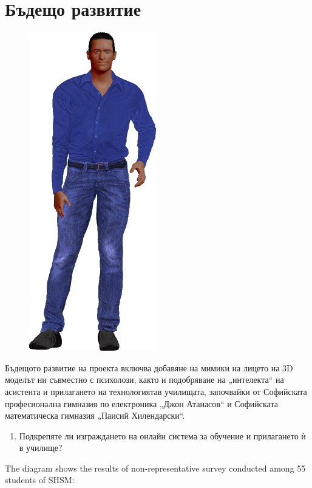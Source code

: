 \documentclass[a4paper, 12pt]{article}
\newenvironment{myblock}[1]
  {\begin{tcolorbox}[colback=green!5,colframe=green!40!black,title=#1]}
  {\end{tcolorbox}}
\begin{document}
	\section{Бъдещо развитие}
	\begin{figure}
		\includegraphics[scale=0.35]{../bad_boy.png}
	\end{figure}
	Бъдещото развитие на проекта включва добавяне на мимики на лицето на 3D моделът ни съвместно с психолози, както и подобряване на „интелекта“ на асистента и прилагането на технологиятав училищата, започвайки от Софийската професионална гимназия по електроника „Джон Атанасов“ и Софийската математическа гимназия „Паисий Хилендарски“. \\ \vspace{0.5cm}
	\begin{center}
		\begin{myblock}{Въпроси от анкета}
			\begin{enumerate}
				\item Подкрепяте ли изграждането на онлайн система за обучение и прилагането ѝ в училище?
			\end{enumerate}
		\end{myblock}
	\end{center}
	The diagram shows the results of non-representative survey conducted among 55 students of SHSM: \\
	\begin{center}
	\end{center}
\end{document}
